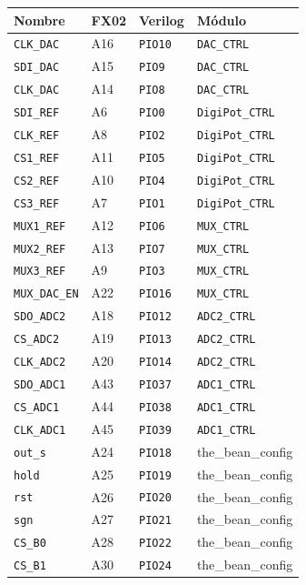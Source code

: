 \clearpage
\begin{center}
\begin{longtable}{|l|l|l|l|}\hline
{\bf Nombre} & {\bf FX02} & {\bf Verilog}&{\bf Módulo} \\ \hline\hline
\verb=CLK_DAC= &A16&\verb+PIO10+& \verb+DAC_CTRL+ \\\hline
\verb=SDI_DAC= &A15&\verb+PIO9+& \verb+DAC_CTRL+ \\\hline
\verb=CLK_DAC= &A14&\verb+PIO8+& \verb+DAC_CTRL+ \\\hline
\verb=SDI_REF= &A6&\verb+PIO0+& \verb+DigiPot_CTRL+ \\\hline
\verb=CLK_REF= &A8&\verb+PIO2+& \verb+DigiPot_CTRL+ \\\hline
\verb=CS1_REF= &A11&\verb+PIO5+& \verb+DigiPot_CTRL+ \\\hline
\verb=CS2_REF= &A10&\verb+PIO4+& \verb+DigiPot_CTRL+ \\\hline
\verb=CS3_REF= &A7&\verb+PIO1+& \verb+DigiPot_CTRL+ \\\hline
\verb=MUX1_REF= &A12&\verb+PIO6+& \verb+MUX_CTRL+ \\\hline
\verb=MUX2_REF= &A13&\verb+PIO7+& \verb+MUX_CTRL+ \\\hline
\verb=MUX3_REF= &A9&\verb+PIO3+& \verb+MUX_CTRL+ \\\hline
\verb=MUX_DAC_EN= &A22&\verb+PIO16+& \verb+MUX_CTRL+ \\\hline
\verb=SDO_ADC2= &A18&\verb+PIO12+& \verb+ADC2_CTRL+ \\\hline
\verb=CS_ADC2= &A19&\verb+PIO13+& \verb+ADC2_CTRL+ \\\hline
\verb=CLK_ADC2= &A20&\verb+PIO14+& \verb+ADC2_CTRL+ \\\hline
\verb=SDO_ADC1= &A43&\verb+PIO37+& \verb+ADC1_CTRL+ \\\hline
\verb=CS_ADC1= &A44&\verb+PIO38+& \verb+ADC1_CTRL+ \\\hline
\verb=CLK_ADC1= &A45&\verb+PIO39+& \verb+ADC1_CTRL+ \\\hline
\verb=out_s= &A24&\verb+PIO18+& the\_bean\_config \\\hline
\verb=hold= &A25&\verb+PIO19+& the\_bean\_config \\\hline
\verb=rst= &A26&\verb+PIO20+& the\_bean\_config \\\hline
\verb=sgn= &A27&\verb+PIO21+& the\_bean\_config \\\hline
\verb=CS_B0= &A28&\verb+PIO22+& the\_bean\_config \\\hline
\verb=CS_B1= &A30&\verb+PIO24+& the\_bean\_config \\\hline

\end{longtable}
\end{center}
